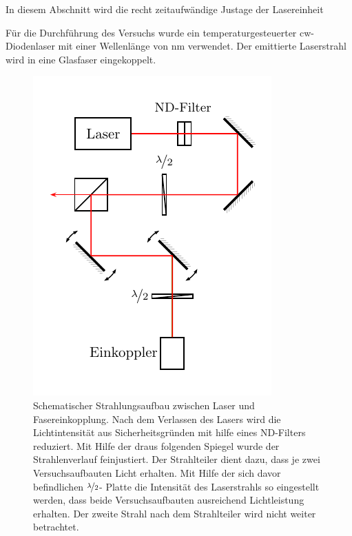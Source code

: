 
In diesem Abschnitt wird die recht zeitaufwändige Justage der Lasereinheit 

Für die Durchführung des Versuchs wurde ein temperaturgesteuerter cw-Diodenlaser mit einer Wellenlänge von \unit[660]{nm} verwendet. Der emittierte Laserstrahl wird in eine Glasfaser eingekoppelt.

\begin{figure}[h]
	\centering
	\includegraphics[width=0.5\linewidth]{graphs/versuchsaufbau/lasereinheit.pdf}
	\caption[Schematischer Aufbau Lasereinheit]{
		Schematischer Strahlungsaufbau zwischen Laser und Fasereinkopplung. Nach dem Verlassen des Lasers wird die Lichtintensität aus Sicherheitsgründen mit hilfe eines ND-Filters reduziert. Mit Hilfe der draus folgenden Spiegel wurde der Strahlenverlauf feinjustiert. Der Strahlteiler dient dazu, dass je zwei Versuchsaufbauten Licht erhalten. Mit Hilfe der sich davor befindlichen $\nicefrac{\lambda}{2}$- Platte die Intensität des Laserstrahls so eingestellt werden, dass beide Versuchsaufbauten ausreichend Lichtleistung erhalten. Der zweite Strahl nach dem Strahlteiler wird nicht weiter betrachtet.
	}
	\label{fig:lasereinheit}
\end{figure}

